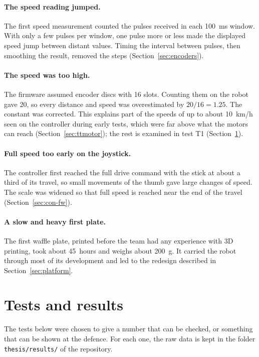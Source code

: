 \paragraph{The speed reading jumped.} The first speed measurement counted the pulses
received in each 100~ms window. With only a few pulses per window, one pulse more or less
made the displayed speed jump between distant values. Timing the interval between pulses,
then smoothing the result, removed the steps (Section~\ref{sec:encoders}).

\paragraph{The speed was too high.} The firmware assumed encoder discs with 16 slots.
Counting them on the robot gave 20, so every distance and speed was overestimated by
\(20/16 = 1.25\). The constant was corrected. This explains part of the speeds of up to
about 10~km/h seen on the controller during early tests, which were far above what the
motors can reach (Section~\ref{sec:ttmotor}); the rest is examined in test T1
(Section~\ref{sec:tests}).

\paragraph{Full speed too early on the joystick.} The controller first reached the full
drive command with the stick at about a third of its travel, so small movements of the
thumb gave large changes of speed. The scale was widened so that full speed is reached near
the end of the travel (Section~\ref{sec:con-fw}).

\paragraph{A slow and heavy first plate.} The first waffle plate, printed before the team had any
experience with 3D printing, took about 45~hours and weighs about 200~g. It carried the
robot through most of its development and led to the redesign described in
Section~\ref{sec:platform}.

\section{Tests and results}
\label{sec:tests}
The tests below were chosen to give a number that can be checked, or something that
can be shown at the defence. For each one, the raw data is kept in the folder
\texttt{thesis/results/} of the repository.

